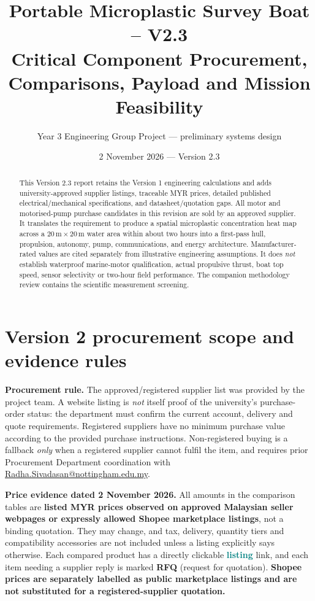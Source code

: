 \documentclass[10pt,a4paper]{article}
\title{\color{navy}\bfseries Portable Microplastic Survey Boat -- V2.3\\[3pt]\large Critical Component Procurement, Comparisons, Payload and Mission Feasibility}
\author{Year 3 Engineering Group Project --- preliminary systems design}\date{2 November 2026 --- Version 2.3}
\begin{document}
\maketitle
\tableofcontents
\begin{abstract}This Version 2.3 report retains the Version 1 engineering calculations and adds university-approved supplier listings, traceable MYR prices, detailed published electrical/mechanical specifications, and datasheet/quotation gaps. All motor and motorised-pump purchase candidates in this revision are sold by an approved supplier. It translates the requirement to produce a spatial microplastic concentration heat map across a $20\,\mathrm{m}\times20\,\mathrm{m}$ water area within about two hours into a first-pass hull, propulsion, autonomy, pump, communications, and energy architecture. Manufacturer-rated values are cited separately from illustrative engineering assumptions. It does \emph{not} establish waterproof marine-motor qualification, actual propulsive thrust, boat top speed, sensor selectivity or two-hour field performance. The companion methodology review contains the scientific measurement screening.\end{abstract}

\section{Version 2 procurement scope and evidence rules}
\textbf{Procurement rule.} The approved/registered supplier list was provided by the project team. A website listing is \emph{not} itself proof of the university's purchase-order status: the department must confirm the current account, delivery and quote requirements. Registered suppliers have no minimum purchase value according to the provided purchase instructions. Non-registered buying is a fallback \emph{only} when a registered supplier cannot fulfil the item, and requires prior Procurement Department coordination with \href{mailto:Radha.Sivadasan@nottingham.edu.my}{Radha.Sivadasan@nottingham.edu.my}.

\textbf{Price evidence dated 2 November 2026.} All amounts in the comparison tables are \textbf{listed MYR prices observed on approved Malaysian seller webpages or expressly allowed Shopee marketplace listings}, not a binding quotation. They may change, and tax, delivery, quantity tiers and compatibility accessories are not included unless a listing explicitly says otherwise. Each compared product has a directly clickable \textcolor{teal}{\textbf{listing}} link, and each item needing a supplier reply is marked \textbf{RFQ} (request for quotation). \textbf{Shopee prices are separately labelled as public marketplace listings and are not substituted for a registered-supplier quotation.}
\end{document}
